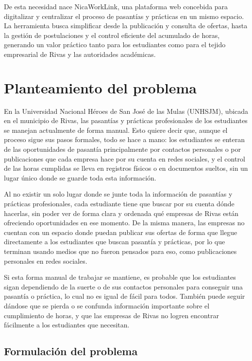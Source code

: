 De esta necesidad nace NicaWorkLink, una plataforma web concebida para digitalizar y centralizar el proceso de pasantías y prácticas en un mismo espacio. La herramienta busca simplificar desde la publicación y consulta de ofertas, hasta la gestión de postulaciones y el control eficiente del acumulado de horas, generando un valor práctico tanto para los estudiantes como para el tejido empresarial de Rivas y las autoridades académicas.

\section{Planteamiento del problema}

En la Universidad Nacional Héroes de San José de las Mulas (UNHSJM), ubicada en el municipio de Rivas, las pasantías y prácticas profesionales de los estudiantes se manejan actualmente de forma manual. Esto quiere decir que, aunque el proceso sigue sus pasos formales, todo se hace a mano: los estudiantes se enteran de las oportunidades de pasantía principalmente por contactos personales o por publicaciones que cada empresa hace por su cuenta en redes sociales, y el control de las horas cumplidas se lleva en registros físicos o en documentos sueltos, sin un lugar único donde se guarde toda esta información.

Al no existir un solo lugar donde se junte toda la información de pasantías y prácticas profesionales, cada estudiante tiene que buscar por su cuenta dónde hacerlas, sin poder ver de forma clara y ordenada qué empresas de Rivas están ofreciendo oportunidades en ese momento. De la misma manera, las empresas no cuentan con un espacio donde puedan publicar sus ofertas de forma que llegue directamente a los estudiantes que buscan pasantía y prácticas, por lo que terminan usando medios que no fueron pensados para eso, como publicaciones personales en redes sociales.

Si esta forma manual de trabajar se mantiene, es probable que los estudiantes sigan dependiendo de la suerte o de sus contactos personales para conseguir una pasantía o práctica, lo cual no es igual de fácil para todos. También puede seguir dándose que se pierda o se confunda información importante sobre el cumplimiento de horas, y que las empresas de Rivas no logren encontrar fácilmente a los estudiantes que necesitan.

\subsection{Formulación del problema}

